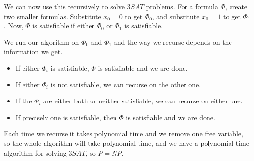 \documentclass{article}
\newenvironment{problem}[2][Problem]{\begin{trivlist}
\item[\hskip \labelsep {\bfseries #1}\hskip \labelsep {\bfseries #2.}]}{\end{trivlist}}
\begin{document}
\begin{problem}{6}
  We can now use this recursively to solve $3SAT$ problems. For a
  formula $\Phi$, create two smaller formulas. Substitute $x_0 = 0$ to
  get $\Phi_0$, and substitute $x_0 = 1$ to get $\Phi_1$. Now, $\Phi$
  is satisfiable if either $\Phi_0$ or $\Phi_1$ is satisfiable.

  We run our algorithm on $\Phi_0$ and $\Phi_1$ and the way we recurse depends on
  the information we get.

  \begin{itemize}
    \item If either $\Phi_i$ is satisfiable, $\Phi$ is satisfiable and
      we are done.
    \item If either $\Phi_i$ is not satisfiable, we can recurse on the
      other one.
    \item If the $\Phi_i$ are either both or neither satisfiable, we
      can recurse on either one.
    \item If precisely one is satisfiable, then $\Phi$ is
      satisfiable and we are done.
  \end{itemize}

  Each time we recurse it takes polynomial time and we remove one free
  variable, so the whole algorithm will take polynomial time, and we
  have a polynomial time algorithm for solving $3SAT$, so $P = NP$.
\end{problem}
\end{document}
